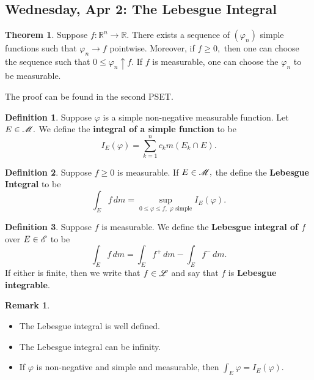 \documentclass[10pt, oneside]{article}
\newcommand{\bbR}{\mathbb{R}}
\theoremstyle{definition}
\newtheorem{thm}{Theorem}
\newtheorem{defn}{Definition}
\newtheorem{rem}{Remark}
\begin{document}
\newpage
\subsection{Wednesday, Apr 2: The Lebesgue Integral}
\begin{thm}
    Suppose $f: \bbR^n \to \bbR.$ There exists a sequence of $(\varphi_n)$ simple functions such that $\varphi_n \to f$ pointwise. Moreover, if $f\geq 0,$ then one can choose the sequence such that $0\leq \varphi_n \uparrow f.$ If $f$ is measurable, one can choose the $\varphi_n$ to be measurable.
\end{thm}
The proof can be found in the second PSET.
\begin{defn}
    Suppose $\varphi$ is a simple non-negative measurable function. Let $E\in \cal M.$ We define the \textbf{integral of a simple function} to be 
    \[I_E(\varphi) = \sum_{k=1}^n c_k m(E_k \cap E).\]
\end{defn}
\begin{defn}
    Suppose $f\geq 0$ is measurable. If $E\in \cal M,$ the define the \textbf{Lebesgue Integral} to be 
    \[\int_E f \, dm = \sup_{0 \leq\varphi \leq f, \; \varphi \text{ simple}} I_E(\varphi).\]
\end{defn}

\begin{defn}
    Suppose $f$ is measurable. We define the \textbf{Lebesgue integral of $f$} over $E \in \cal E$ to be
    \[\int_E f \, dm = \int_E f^+ \, dm -\int_E f^-\, dm.\] If either is finite, then we write that $f\in \cal L$ and say that $f$ is \textbf{Lebesgue integrable}.
\end{defn}
\begin{rem}
    \begin{itemize}
        \item The Lebesgue integral is well defined.
        \item The Lebesgue integral can be infinity.
        \item If $\varphi$ is non-negative and simple and measurable, then $\int_E \varphi = I_E(\varphi).$
    \end{itemize}
\end{rem}


\newpage
\end{document}
